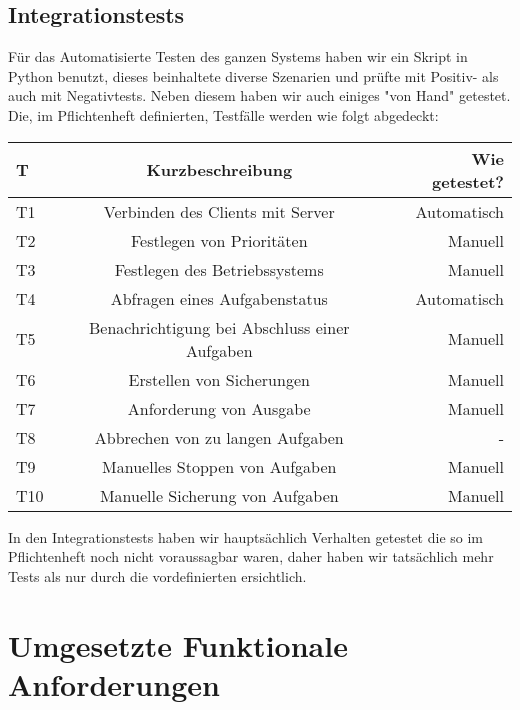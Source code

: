\documentclass[a4paper,12pt]{article}
\begin{document}
\subsection{Integrationstests}
\vspace{0.2cm}
Für das Automatisierte Testen des ganzen Systems haben wir ein Skript in Python benutzt, dieses beinhaltete diverse Szenarien und prüfte mit Positiv- als auch mit Negativtests. Neben diesem haben wir auch einiges "von Hand" getestet.
Die, im Pflichtenheft definierten, Testfälle werden wie folgt abgedeckt: \newline
\begin{tabular}{|l|c|r|}
	\hline
	T & Kurzbeschreibung & Wie getestet? \\ \hline \hline
	T1 & Verbinden des Clients mit Server & Automatisch \\ \hline
	T2 & Festlegen von Prioritäten & Manuell \\ \hline
	T3 & Festlegen des Betriebssystems & Manuell \\ \hline
	T4 & Abfragen eines Aufgabenstatus & Automatisch \\ \hline
	T5 & Benachrichtigung bei Abschluss einer Aufgaben & Manuell \\ \hline
	T6 & Erstellen von Sicherungen & Manuell \\ \hline
	T7 & Anforderung von Ausgabe & Manuell \\ \hline
	T8 & Abbrechen von zu langen Aufgaben & - \\ \hline
	T9 & Manuelles Stoppen von Aufgaben & Manuell \\ \hline
	T10 & Manuelle Sicherung von Aufgaben & Manuell \\ \hline
\end{tabular}
\newline \newline
In den Integrationstests haben wir hauptsächlich Verhalten getestet die so im Pflichtenheft noch nicht voraussagbar waren, daher haben wir tatsächlich mehr Tests als nur durch die vordefinierten ersichtlich.
\section{Umgesetzte Funktionale Anforderungen}
\end{document}
